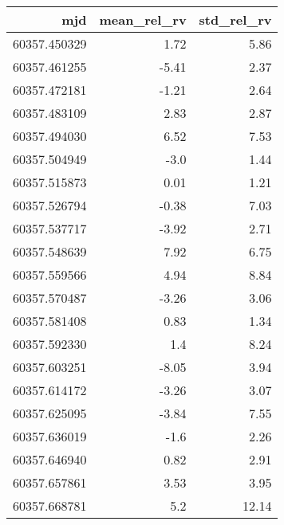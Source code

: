 \begin{tabular}{rrr}
\toprule
mjd & mean_rel_rv & std_rel_rv \\
\midrule
60357.450329 & 1.72 & 5.86 \\
60357.461255 & -5.41 & 2.37 \\
60357.472181 & -1.21 & 2.64 \\
60357.483109 & 2.83 & 2.87 \\
60357.494030 & 6.52 & 7.53 \\
60357.504949 & -3.0 & 1.44 \\
60357.515873 & 0.01 & 1.21 \\
60357.526794 & -0.38 & 7.03 \\
60357.537717 & -3.92 & 2.71 \\
60357.548639 & 7.92 & 6.75 \\
60357.559566 & 4.94 & 8.84 \\
60357.570487 & -3.26 & 3.06 \\
60357.581408 & 0.83 & 1.34 \\
60357.592330 & 1.4 & 8.24 \\
60357.603251 & -8.05 & 3.94 \\
60357.614172 & -3.26 & 3.07 \\
60357.625095 & -3.84 & 7.55 \\
60357.636019 & -1.6 & 2.26 \\
60357.646940 & 0.82 & 2.91 \\
60357.657861 & 3.53 & 3.95 \\
60357.668781 & 5.2 & 12.14 \\
\bottomrule
\end{tabular}
